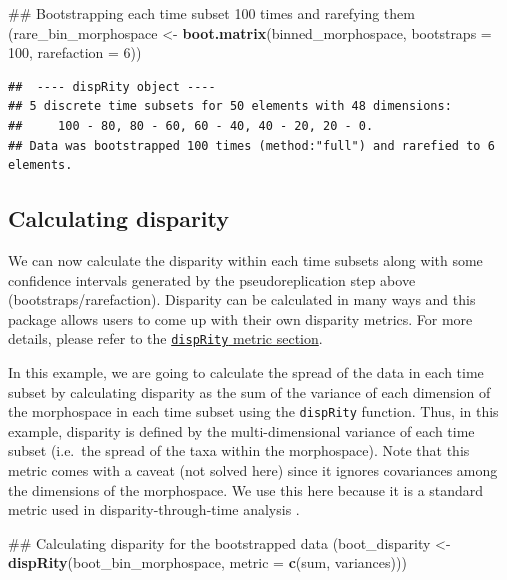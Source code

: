 \documentclass[]{book}
\newenvironment{Shaded}{\begin{snugshade}}{\end{snugshade}}
\newcommand{\KeywordTok}[1]{\textcolor[rgb]{0.13,0.29,0.53}{\textbf{#1}}}
\newcommand{\DataTypeTok}[1]{\textcolor[rgb]{0.13,0.29,0.53}{#1}}
\newcommand{\DecValTok}[1]{\textcolor[rgb]{0.00,0.00,0.81}{#1}}
\newcommand{\StringTok}[1]{\textcolor[rgb]{0.31,0.60,0.02}{#1}}
\newcommand{\NormalTok}[1]{#1}
\theoremstyle{definition}
\theoremstyle{definition}
\theoremstyle{definition}
\theoremstyle{remark}
\begin{document}
\begin{Shaded}
\begin{Highlighting}[]
\NormalTok{## Bootstrapping each time subset 100 times and rarefying them }
\NormalTok{(rare_bin_morphospace <-}\StringTok{ }\KeywordTok{boot.matrix}\NormalTok{(binned_morphospace, }\DataTypeTok{bootstraps =} \DecValTok{100}\NormalTok{,}
    \DataTypeTok{rarefaction =} \DecValTok{6}\NormalTok{))}
\end{Highlighting}
\end{Shaded}

\begin{verbatim}
##  ---- dispRity object ---- 
## 5 discrete time subsets for 50 elements with 48 dimensions:
##     100 - 80, 80 - 60, 60 - 40, 40 - 20, 20 - 0.
## Data was bootstrapped 100 times (method:"full") and rarefied to 6 elements.
\end{verbatim}

\subsection{Calculating disparity}\label{calculating-disparity}

We can now calculate the disparity within each time subsets along with
some confidence intervals generated by the pseudoreplication step above
(bootstraps/rarefaction). Disparity can be calculated in many ways and
this package allows users to come up with their own disparity metrics.
For more details, please refer to the
\protect\hyperlink{disparity-metrics}{\texttt{dispRity} metric section}.

In this example, we are going to calculate the spread of the data in
each time subset by calculating disparity as the sum of the variance of
each dimension of the morphospace in each time subset using the
\texttt{dispRity} function. Thus, in this example, disparity is defined
by the multi-dimensional variance of each time subset (i.e.~the spread
of the taxa within the morphospace). Note that this metric comes with a
caveat (not solved here) since it ignores covariances among the
dimensions of the morphospace. We use this here because it is a standard
metric used in disparity-through-time analysis \citep{Wills1994}.

\begin{Shaded}
\begin{Highlighting}[]
\NormalTok{## Calculating disparity for the bootstrapped data}
\NormalTok{(boot_disparity <-}\StringTok{ }\KeywordTok{dispRity}\NormalTok{(boot_bin_morphospace, }\DataTypeTok{metric =} \KeywordTok{c}\NormalTok{(sum, variances)))}
\end{Highlighting}
\end{Shaded}
\end{document}
